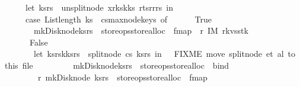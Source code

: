 \begin{isabellebody}
\ \ \ \ \ \ let\ {\isacharparenleft}ks{\isacharprime}{\isacharcomma}rs{\isacharprime}{\isacharparenright}\ {\isacharequal}\ unsplit{\isacharunderscore}node\ {\isacharparenleft}x{\isasymlparr}r{\isacharunderscore}ks{}{\isacharcolon}{\isacharequal}k{\isacharhash}ks{}{\isacharcomma}\ r{\isacharunderscore}ts{}{\isacharcolon}{\isacharequal}{\isacharbrackleft}r{}{\isacharcomma}r{}{\isacharbrackright}{\isacharat}rs{}{\isasymrparr}{\isacharparenright}\ in\isanewline
\ \ \ \ \ \ case\ {\isacharparenleft}List{\isachardot}length\ ks{\isacharprime}\ {\isasymle}\ cs{\isacharbar}{\isachargreater}max{\isacharunderscore}node{\isacharunderscore}keys{\isacharparenright}\ of\isanewline
\ \ \ \ \ \ True\ {\isasymRightarrow}\ {\isacharparenleft}\isanewline
\ \ \ \ \ \ \ \ mk{\isacharunderscore}Disk{\isacharunderscore}node{\isacharparenleft}ks{\isacharprime}{\isacharcomma}rs{\isacharprime}{\isacharparenright}\ {\isacharbar}{\isachargreater}\ {\isacharparenleft}store{\isacharunderscore}ops{\isacharbar}{\isachargreater}store{\isacharunderscore}alloc{\isacharparenright}\ {\isacharbar}{\isachargreater}\ fmap\ {\isacharparenleft}{\isacharpercent}\ r{\isachardot}\ {\isacharparenleft}IM{}\ {\isacharparenleft}r{\isacharcomma}kvs{}{\isacharparenright}{\isacharcomma}stk{\isacharprime}{\isacharparenright}{\isacharparenright}{\isacharparenright}\isanewline
\ \ \ \ \ \ {\isacharbar}\ False\ {\isasymRightarrow}\ {\isacharparenleft}\isanewline
\ \ \ \ \ \ \ \ let\ {\isacharparenleft}ks{\isacharunderscore}rs{}{\isacharcomma}k{\isacharcomma}ks{\isacharunderscore}rs{}{\isacharparenright}\ {\isacharequal}\ split{\isacharunderscore}node\ cs\ {\isacharparenleft}ks{\isacharprime}{\isacharcomma}rs{\isacharprime}{\isacharparenright}\ in\ \ {\isacharparenleft}{\isacharasterisk}\ FIXME\ move\ split{\isacharunderscore}node\ et\ al\ to\ this\ file\ {\isacharasterisk}{\isacharparenright}\isanewline
\ \ \ \ \ \ \ \ mk{\isacharunderscore}Disk{\isacharunderscore}node{\isacharparenleft}ks{\isacharunderscore}rs{}{\isacharparenright}\ {\isacharbar}{\isachargreater}\ {\isacharparenleft}store{\isacharunderscore}ops{\isacharbar}{\isachargreater}store{\isacharunderscore}alloc{\isacharparenright}\ {\isacharbar}{\isachargreater}\ bind\isanewline
\ \ \ \ \ \ \ \ {\isacharparenleft}{\isacharpercent}\ r{}{\isachardot}\ mk{\isacharunderscore}Disk{\isacharunderscore}node\ {\isacharparenleft}ks{\isacharunderscore}rs{}{\isacharparenright}\ {\isacharbar}{\isachargreater}\ {\isacharparenleft}store{\isacharunderscore}ops{\isacharbar}{\isachargreater}store{\isacharunderscore}alloc{\isacharparenright}\ {\isacharbar}{\isachargreater}\ fmap\ \isanewline

\end{isabellebody}
